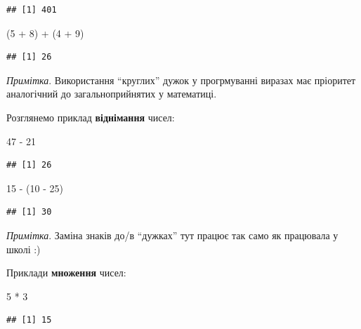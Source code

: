 \documentclass[
]{book}
\newenvironment{Shaded}{\begin{snugshade}}{\end{snugshade}}
\newcommand{\DecValTok}[1]{\textcolor[rgb]{0.00,0.00,0.81}{#1}}
\newcommand{\NormalTok}[1]{#1}
\newcommand{\SpecialCharTok}[1]{\textcolor[rgb]{0.00,0.00,0.00}{#1}}
\begin{document}
\begin{verbatim}
## [1] 401
\end{verbatim}

\begin{Shaded}
\begin{Highlighting}[]
\NormalTok{(}\DecValTok{5} \SpecialCharTok{+} \DecValTok{8}\NormalTok{) }\SpecialCharTok{+}\NormalTok{ (}\DecValTok{4} \SpecialCharTok{+} \DecValTok{9}\NormalTok{)}
\end{Highlighting}
\end{Shaded}

\begin{verbatim}
## [1] 26
\end{verbatim}

\emph{Примітка}. Використання ``круглих'' дужок у прогрмуванні виразах має пріоритет аналогічний до загальноприйнятих у математиці.

Розглянемо приклад \textbf{віднімання} чисел:

\begin{Shaded}
\begin{Highlighting}[]
\DecValTok{47} \SpecialCharTok{{-}} \DecValTok{21}
\end{Highlighting}
\end{Shaded}

\begin{verbatim}
## [1] 26
\end{verbatim}

\begin{Shaded}
\begin{Highlighting}[]
\DecValTok{15} \SpecialCharTok{{-}}\NormalTok{ (}\DecValTok{10} \SpecialCharTok{{-}} \DecValTok{25}\NormalTok{)}
\end{Highlighting}
\end{Shaded}

\begin{verbatim}
## [1] 30
\end{verbatim}

\emph{Примітка}. Заміна знаків до/в ``дужках'' тут працює так само як працювала у школі :)

Приклади \textbf{множення} чисел:

\begin{Shaded}
\begin{Highlighting}[]
\DecValTok{5} \SpecialCharTok{*} \DecValTok{3}
\end{Highlighting}
\end{Shaded}

\begin{verbatim}
## [1] 15
\end{verbatim}
\end{document}
